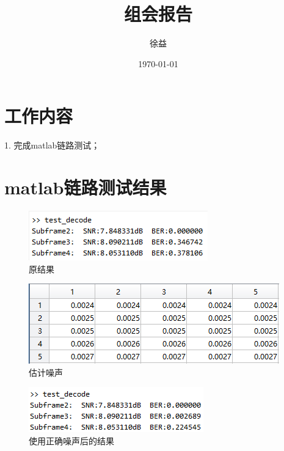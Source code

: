 \documentclass{article}
\title{组会报告}
\author{徐益}
\date{\today}
\begin{document}
\maketitle


\section{工作内容}
1. 完成matlab链路测试；

\section{matlab链路测试结果}
\begin{figure}[H]
	\centering
	\includegraphics[width = .6\textwidth]{oldrst.png}
	\caption{原结果}
\end{figure}
\begin{figure}[H]
	\centering
	\includegraphics[width = .8\textwidth]{estn.png}
	\caption{估计噪声}
\end{figure}
\begin{figure}[H]
	\centering
	\includegraphics[width = .6\textwidth]{newrst.png}
	\caption{使用正确噪声后的结果}
\end{figure}

\end{document}
